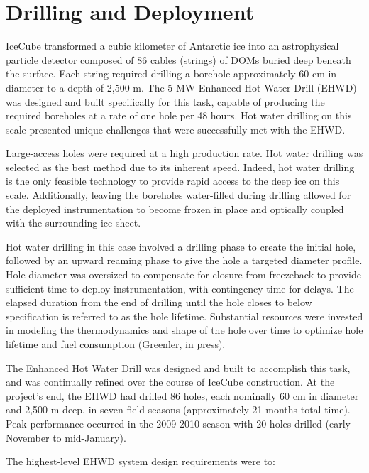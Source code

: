 
\section{Drilling and Deployment}
IceCube transformed a cubic kilometer of Antarctic ice into an astrophysical particle detector composed of 86 cables (strings) of DOMs buried deep beneath the surface.  Each string required drilling a borehole approximately 60 cm in diameter to a depth of 2,500 m.  The 5 MW Enhanced Hot Water Drill (EHWD) was designed and built specifically for this task, capable of producing the required boreholes at a rate of one hole per 48 hours. Hot water drilling on this scale presented unique challenges that were successfully met with the EHWD.

Large-access holes were required at a high production rate.  Hot water drilling was selected as the best method due to its inherent speed.  Indeed, hot water drilling is the only feasible technology to provide rapid access to the deep ice on this scale.  Additionally, leaving the boreholes water-filled during drilling allowed for the deployed instrumentation to become frozen in place and optically coupled with the surrounding ice sheet.
 
Hot water drilling in this case involved a drilling phase to create the initial hole, followed by an upward reaming phase to give the hole a targeted diameter profile.  Hole diameter was oversized to compensate for closure from freezeback to provide sufficient time to deploy instrumentation, with contingency time for delays.  The elapsed duration from the end of drilling until the hole closes to below specification is referred to as the hole lifetime.  Substantial resources were invested in modeling the thermodynamics and shape of the hole over time to optimize hole lifetime and fuel consumption (Greenler, in press).

The Enhanced Hot Water Drill was designed and built to accomplish this task, and was continually refined over the course of IceCube construction.  At the project’s end, the EHWD had drilled 86 holes, each nominally 60 cm in diameter and 2,500 m deep, in seven field seasons (approximately 21 months total time).  Peak performance occurred in the 2009-2010 season with 20 holes drilled (early November to mid-January).  

The highest-level EHWD system design requirements were to:

